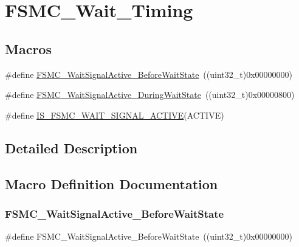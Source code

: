 \hypertarget{group___f_s_m_c___wait___timing}{}\section{F\+S\+M\+C\+\_\+\+Wait\+\_\+\+Timing}
\label{group___f_s_m_c___wait___timing}
\subsection*{Macros}
\begin{DoxyCompactItemize}
\item 
\#define \mbox{\hyperlink{group___f_s_m_c___wait___timing_ga62c6855a7cc65b20024085f09cdc65e8}{F\+S\+M\+C\+\_\+\+Wait\+Signal\+Active\+\_\+\+Before\+Wait\+State}}~((uint32\+\_\+t)0x00000000)
\item 
\#define \mbox{\hyperlink{group___f_s_m_c___wait___timing_gae905fc59e5d99091d132d7c221c8b6d4}{F\+S\+M\+C\+\_\+\+Wait\+Signal\+Active\+\_\+\+During\+Wait\+State}}~((uint32\+\_\+t)0x00000800)
\item 
\#define \mbox{\hyperlink{group___f_s_m_c___wait___timing_ga3edb40c756afa8bb78550b7e22ded093}{I\+S\+\_\+\+F\+S\+M\+C\+\_\+\+W\+A\+I\+T\+\_\+\+S\+I\+G\+N\+A\+L\+\_\+\+A\+C\+T\+I\+VE}}(A\+C\+T\+I\+VE)
\end{DoxyCompactItemize}


\subsection{Detailed Description}


\subsection{Macro Definition Documentation}
\mbox{\label{group___f_s_m_c___wait___timing_ga62c6855a7cc65b20024085f09cdc65e8}} 
\subsubsection{\texorpdfstring{FSMC\_WaitSignalActive\_BeforeWaitState}{FSMC\_WaitSignalActive\_BeforeWaitState}}
{\footnotesize\ttfamily \#define F\+S\+M\+C\+\_\+\+Wait\+Signal\+Active\+\_\+\+Before\+Wait\+State~((uint32\+\_\+t)0x00000000)}

